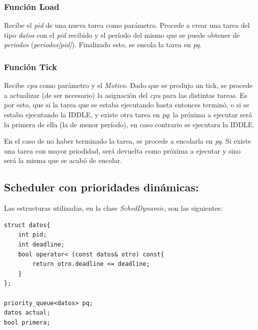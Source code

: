 \documentclass[a4paper]{article}
\begin{document}
\subsubsection*{Funci\'on Load}

Recibe el \emph{pid} de una nueva tarea como par\'ametro. Procede a crear una tarea del tipo \emph{datos} con el \emph{pid} recibido y el per\'iodo del mismo que se puede obtener de \emph{periodos} (\emph{periodos[pid]}). Finalizado esto, se encola la tarea en \emph{pq}.

\subsubsection*{Funci\'on Tick}	

Recibe \emph{cpu} como par\'ametro y el \emph{Motivo}. Dado que se produjo un tick, se procede a actualizar (de ser necesario) la asignación del \emph{cpu} para las distintas tareas.  Es por esto, que si la tarea que se estaba ejecutando hasta entonces terminó, o si se estaba ejecutando la IDDLE, y existe otra tarea en \emph{pq}; la próxima a ejecutar será la primera de ella (la de menor período), en caso contrario se ejecutara la IDDLE. 

En el caso de no haber terminado la tarea, se procede a encolarla en \emph{pq}. Si existe una tarea con mayor priodidad, ser\'a devuelta como próxima a ejecutar y sino ser\'a la misma que se acab\'o de encolar. \\ 


 
\bigskip 

\subsection*{Scheduler con prioridades dinámicas:}

Las estructuras utilizadas, en la clase \emph{SchedDynamic}, son las siguientes:
	\begin{codesnippet}
	\begin{verbatim}
struct datos{
    int pid;
    int deadline;
    bool operator< (const datos& otro) const{
        return otro.deadline <= deadline; 
    }
};

priority_queue<datos> pq;
datos actual;
bool primera;
	\end{verbatim}
	\end{codesnippet}
	
\end{document}
